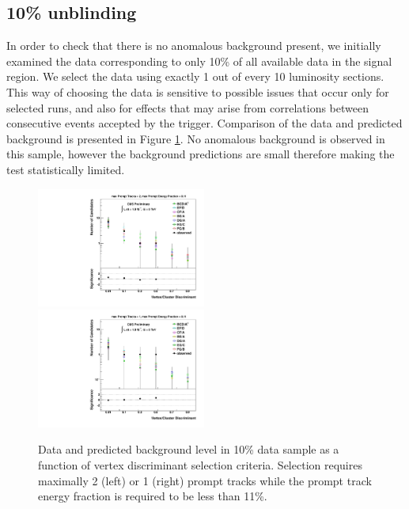 \subsection{10\% unblinding}
\label{subsec:partunblinding}

In order to check that there is no anomalous background present,
 we initially examined the data corresponding to only 10\% of all available 
data in the signal region.  
We select the data using exactly 1 out of every 10 luminosity sections. This way of choosing 
the data is sensitive to possible issues that occur only for selected runs, and also for effects that may arise from
correlations between consecutive events accepted by the trigger. Comparison of the data and predicted
background is presented in Figure \ref{fig:10percent}. No anomalous background is observed in this sample,
however the background predictions are small therefore making the test statistically limited.

\begin{figure}[htbp]
  \centering
  \includegraphics[width=0.495\textwidth]{plots/background/tenpercent1.pdf}
  \includegraphics[width=0.495\textwidth]{plots/background/tenpercent2.pdf}
  \caption{Data and predicted background level in 10\% data sample as a function of vertex discriminant
selection criteria. Selection requires maximally 2 (left) or 1 (right) prompt tracks while the prompt track energy 
fraction is required to be less than 11\%. \label{fig:10percent}}
\end{figure}  


